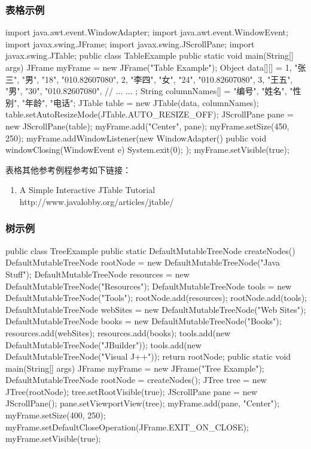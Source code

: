 \subsubsection{表格示例}

\begin{javaCode}
  import java.awt.event.WindowAdapter;
  import java.awt.event.WindowEvent;
  import javax.swing.JFrame;
  import javax.swing.JScrollPane;
  import javax.swing.JTable;
  public class TableExample {
    public static void main(String[] args) {
      JFrame myFrame = new JFrame("Table Example");
      Object data[][] = {
        {1, "张三", "男", "18", "010.82607080"},
        {2, "李四", "女", "24", "010.82607080"},
        {3, "王五", "男", "30", "010.82607080"},
        // ... ...
      };
      String columnNames[] = {
        "编号", "姓名", "性别", "年龄", "电话"};
      JTable table = new JTable(data, columnNames);
      table.setAutoResizeMode(JTable.AUTO_RESIZE_OFF);
      JScrollPane pane = new JScrollPane(table);
      myFrame.add("Center", pane);
      myFrame.setSize(450, 250);
      myFrame.addWindowListener(new WindowAdapter(){
        public void windowClosing(WindowEvent e) {
          System.exit(0);
        }
      });
      myFrame.setVisible(true);
    }
  }
\end{javaCode}

表格其他参考例程参考如下链接：
\begin{enumerate}
\item A Simple Interactive JTable Tutorial\\
  http://www.javalobby.org/articles/jtable/
\end{enumerate}

\subsubsection{树示例}

\begin{javaCode}
  public class TreeExample {
    public static DefaultMutableTreeNode createNodes() {
      DefaultMutableTreeNode rootNode = new DefaultMutableTreeNode("Java Stuff");
      DefaultMutableTreeNode resources = new DefaultMutableTreeNode("Resources");
      DefaultMutableTreeNode tools = new DefaultMutableTreeNode("Tools");
      rootNode.add(resources);
      rootNode.add(tools);
      DefaultMutableTreeNode webSites = new DefaultMutableTreeNode("Web Sites");
      DefaultMutableTreeNode books = new DefaultMutableTreeNode("Books");
      resources.add(webSites);
      resources.add(books);
      tools.add(new DefaultMutableTreeNode("JBuilder"));
      tools.add(new DefaultMutableTreeNode("Visual J++"));
      return rootNode;
    }
    public static void main(String[] args) {
      JFrame myFrame = new JFrame("Tree Example");
      DefaultMutableTreeNode rootNode = createNodes();
      JTree tree = new JTree(rootNode);
      tree.setRootVisible(true);
      JScrollPane pane = new JScrollPane();
      pane.setViewportView(tree);
      myFrame.add(pane, "Center");
      myFrame.setSize(400, 250);
      myFrame.setDefaultCloseOperation(JFrame.EXIT_ON_CLOSE);
      myFrame.setVisible(true);
    }
  }
\end{javaCode}

